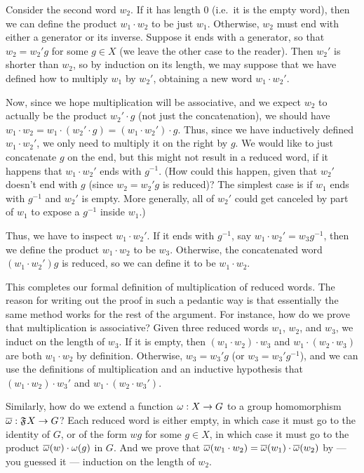 Consider the second word $w_2$.
If it has length $0$ (i.e.\ it is the empty word), then we can define the product $w_1\cdot w_2$ to be just $w_1$.
Otherwise, $w_2$ must end with either a generator or its inverse.
Suppose it ends with a generator, so that $w_2 = w_2' g$ for some $g\in X$ (we leave the other case to the reader).
Then $w_2'$ is shorter than $w_2$, so by induction on its length, we may suppose that we have defined how to multiply $w_1$ by $w_2'$, obtaining a new word $w_1 \cdot w_2'$.

Now, since we hope multiplication will be associative, and we expect $w_2$ to actually be the product $w_2' \cdot g$ (not just the concatenation), we should have $w_1 \cdot w_2 = w_1 \cdot (w_2'\cdot g) = (w_1\cdot w_2')\cdot g$.
Thus, since we have inductively defined $w_1\cdot w_2'$, we only need to multiply it on the right by $g$.
We would like to just concatenate $g$ on the end, but this might not result in a reduced word, if it happens that $w_1\cdot w_2'$ ends with $g^{-1}$.
(How could this happen, given that $w_2'$ doesn't end with $g$ (since $w_2 = w_2'g$ is reduced)?
The simplest case is if $w_1$ ends with $g^{-1}$ and $w_2'$ is empty.
More generally, all of $w_2'$ could get canceled by part of $w_1$ to expose a $g^{-1}$ inside $w_1$.)

Thus, we have to inspect $w_1\cdot w_2'$.
If it ends with $g^{-1}$, say $w_1\cdot w_2' = w_3 g^{-1}$, then we define the product $w_1 \cdot w_2$ to be $w_3$.
Otherwise, the concatenated word $(w_1\cdot w_2')g$ is reduced, so we can define it to be $w_1\cdot w_2$.

This completes our formal definition of multiplication of reduced words.
The reason for writing out the proof in such a pedantic way is that essentially the same method works for the rest of the argument.
For instance, how do we prove that multiplication is associative?
Given three reduced words $w_1$, $w_2$, and $w_3$, we induct on the length of $w_3$.
If it is empty, then $(w_1\cdot w_2)\cdot w_3$ and $w_1 \cdot (w_2 \cdot w_3)$ are both $w_1\cdot w_2$ by definition.
Otherwise, $w_3 = w_3'g$ (or $w_3 = w_3'g^{-1}$), and we can use the definitions of multiplication and an inductive hypothesis that $(w_1\cdot w_2)\cdot w_3'$ and $w_1 \cdot (w_2 \cdot w_3')$.

Similarly, how do we extend a function $\omega:X\to G$ to a group homomorphism $\overline{\omega}:\mathfrak{F}_{}X\to G$?
Each reduced word is either empty, in which case it must go to the identity of $G$, or of the form $wg$ for some $g\in X$, in which case it must go to the product $\overline{\omega}(w)\cdot \omega(g)$ in $G$.
And we prove that $\overline{\omega}(w_1\cdot w_2) = \overline{\omega}(w_1)\cdot \overline{\omega}(w_2)$ by --- you guessed it --- induction on the length of $w_2$.

